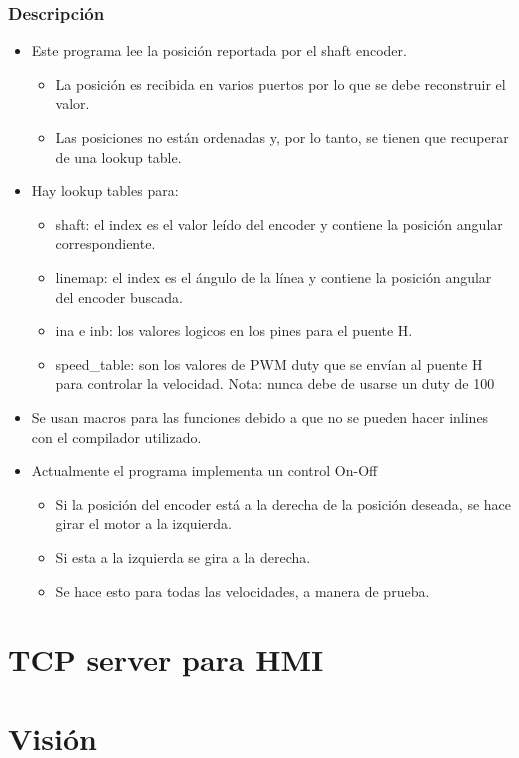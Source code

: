 \subsubsection{Descripción}
\begin{itemize}
\item Este programa lee la posición reportada por el shaft encoder.
	\begin{itemize}
	\item La posición es recibida en varios puertos por lo que se debe reconstruir el valor.
	\item Las posiciones no están ordenadas y, por lo tanto, se tienen que recuperar de una lookup table.

	\end{itemize}
\item Hay lookup tables para:
	\begin{itemize}
	\item shaft: el index es el valor leído del encoder y contiene la posición angular correspondiente.
	\item linemap: el index es el ángulo de la línea y contiene la posición angular del encoder buscada.
	\item ina e inb: los valores logicos en los pines para el puente H.
	\item speed\_table: son los valores de PWM duty que se envían al puente H para controlar la velocidad. Nota: nunca debe de usarse un duty de 100%
	\end{itemize}
\item Se usan macros para las funciones debido a que no se pueden hacer inlines con el compilador utilizado.
\item Actualmente el programa implementa un control On-Off
	\begin{itemize}
	\item Si la posición del encoder está a la derecha de la posición deseada, se hace girar el motor a la izquierda.
	\item Si esta a la izquierda se gira a la derecha.
	\item Se hace esto para todas las velocidades, a manera de prueba.
	\end{itemize}
\end{itemize}
\section{TCP server para HMI}

\section{Visión}
